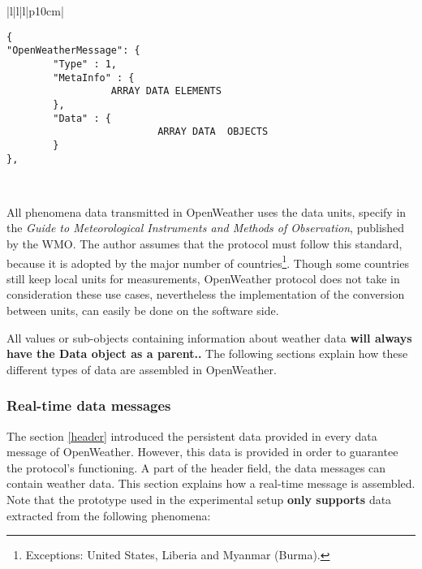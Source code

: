 \begin{table}[H]
\centering
\begin{tabular}{|l|l|l|p{10cm}|}
\hline
\begin{minipage}[t]{\linewidth}
	\begin{verbatim}
{
"OpenWeatherMessage": {
        "Type" : 1,
        "MetaInfo" : {
	              ARRAY DATA ELEMENTS
        },
        "Data" : {
        	              ARRAY DATA  OBJECTS
        }
},
      \end{verbatim}
\end{minipage} \\
\hline
\end{tabular}
\caption{Data field in a data message of OpenWeather protocol.}
\end{table}

All phenomena data transmitted in OpenWeather uses the data units, specify in the \emph{Guide to Meteorological Instruments and Methods of Observation}\cite{GMIMO}, published by the \gls{WMO}\cite{WMO}. The author assumes that the protocol must follow this standard, because it is adopted by the major number of countries\footnote{Exceptions: United States, Liberia and Myanmar (Burma).}. Though some countries still keep local units for measurements, OpenWeather protocol does not take in consideration these use cases, nevertheless the implementation of the conversion between units, can easily be done on the software side.
 
All values or sub-objects containing information about weather data \textbf{will always have the Data object as a parent..}
The following sections explain how these different types of data are assembled in OpenWeather.

\subsubsection{Real-time data messages}

The section \ref{header} introduced the persistent data provided in every data message of OpenWeather. However, this data is provided in order to guarantee the protocol's functioning. A part of the header field, the data messages can contain weather data. This section explains how a real-time message is assembled. Note that the prototype used in the experimental setup \textbf{only supports} data extracted from the following phenomena:


